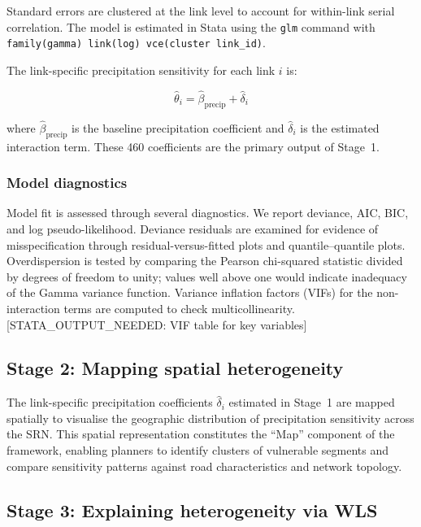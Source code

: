 \documentclass[review]{elsarticle}
\begin{document}
Standard errors are clustered at the link level to account for within-link serial correlation. The model is estimated in Stata using the \texttt{glm} command with \texttt{family(gamma) link(log) vce(cluster link\_id)}.

The link-specific precipitation sensitivity for each link $i$ is:

\begin{equation}
\label{eq:sensitivity}
\hat{\theta}_i = \hat{\beta}_{\text{precip}} + \hat{\delta}_i
\end{equation}

\noindent where $\hat{\beta}_{\text{precip}}$ is the baseline precipitation coefficient and $\hat{\delta}_i$ is the estimated interaction term. These 460 coefficients are the primary output of Stage~1.

\subsubsection{Model diagnostics}

Model fit is assessed through several diagnostics. We report deviance, AIC, BIC, and log pseudo-likelihood. Deviance residuals are examined for evidence of misspecification through residual-versus-fitted plots and quantile--quantile plots. Overdispersion is tested by comparing the Pearson chi-squared statistic divided by degrees of freedom to unity; values well above one would indicate inadequacy of the Gamma variance function. Variance inflation factors (VIFs) for the non-interaction terms are computed to check multicollinearity. [STATA\_OUTPUT\_NEEDED: VIF table for key variables]


\subsection{Stage 2: Mapping spatial heterogeneity}
\label{sec:method:map}

The link-specific precipitation coefficients $\hat{\delta}_i$ estimated in Stage~1 are mapped spatially to visualise the geographic distribution of precipitation sensitivity across the SRN. This spatial representation constitutes the ``Map'' component of the framework, enabling planners to identify clusters of vulnerable segments and compare sensitivity patterns against road characteristics and network topology.

\subsection{Stage 3: Explaining heterogeneity via WLS}
\label{sec:method:feature}
\end{document}
